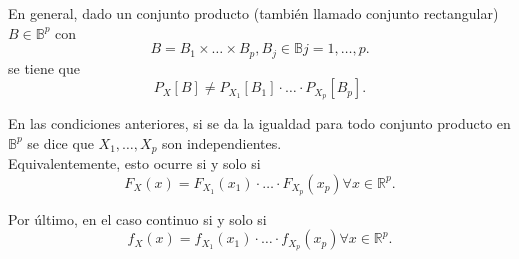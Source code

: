 En general, dado un conjunto producto (también llamado conjunto rectangular) $B \in \mathbb{B}^p$ con
\[
    B = B_1 \times \dots \times B_p, B_j \in \mathbb{B} j = 1, \dots, p
.\]
se tiene que
\[
P_X[B] \neq P_{X_1}[B_1]\cdot \dots \cdot P_X_p[B_p]
.\]

\begin{Independencia}
    En las condiciones anteriores, si se da la igualdad para todo conjunto producto en $\mathbb{B}^p$ se dice que $X_1, \dots, X_p$ son independientes. \\

    Equivalentemente, esto ocurre si y solo si
    \[
    F_X(x) = F_X_1 (x_1)\cdot \dots \cdot F_X_p(x_p) \forall x \in \mathbb{R}^p
    .\]

    Por último, en el caso continuo si y solo si
    \[
    f_X(x) = f_X_1(x_1) \cdot \dots \cdot f_X_p(x_p) \forall x \in \mathbb{R}^p
    .\]
\end{Independencia}
